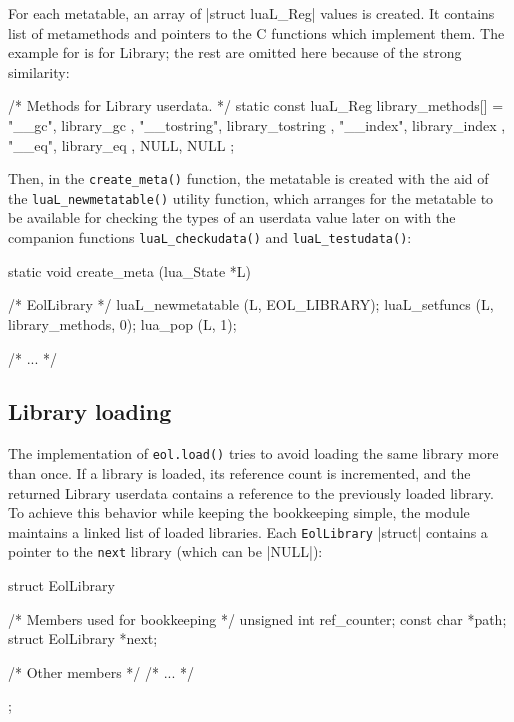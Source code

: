 For each metatable, an array of \Mc|struct luaL_Reg| values is created. It
contains list of metamethods and pointers to the C functions which implement
them. The example for is for \textsf{Library}; the rest are omitted here
because of the strong similarity:

\begin{ccode}
/* Methods for Library userdata. */
static const luaL_Reg library_methods[] = {
    { "__gc",       library_gc       },
    { "__tostring", library_tostring },
    { "__index",    library_index    },
    { "__eq",       library_eq       },
    { NULL, NULL }
};
\end{ccode}

Then, in the \verb|create_meta()| function, the metatable is created with the
aid of the \verb|luaL_newmetatable()| utility function, which arranges for the
metatable to be available for checking the types of an userdata value later on
with the companion functions \verb|luaL_checkudata()| and \verb|luaL_testudata()|:

\begin{ccode}
static void
create_meta (lua_State *L) {
    /* EolLibrary */
    luaL_newmetatable (L, EOL_LIBRARY);
    luaL_setfuncs (L, library_methods, 0);
    lua_pop (L, 1);

    /* ... */
}
\end{ccode}


\subsection{Library loading}

The implementation of \verb|eol.load()| tries to avoid loading the same
library more than once. If a library is loaded, its reference count is
incremented, and the returned \textsf{Library} userdata contains a reference
to the previously loaded library. To achieve this behavior while keeping the
bookkeeping simple, the module maintains a linked list of loaded libraries.
Each \verb|EolLibrary| \Mc|struct| contains a pointer to the \verb|next|
library (which can be \Mc|NULL|):

\begin{ccode}
struct EolLibrary {
  /* Members used for bookkeeping */
  unsigned int       ref_counter;
  const char        *path;
  struct EolLibrary *next;

  /* Other members */
  /* ... */
};
\end{ccode}

